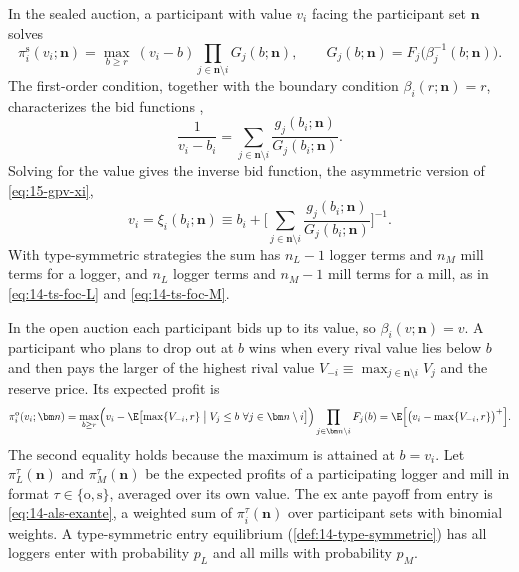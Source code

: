 In the sealed auction, a participant with value $v_i$ facing the participant set $\bm n$ solves
\citep[eq.~(1)]{AtheyLevinSeira2011}
\begin{equation}\label{eq:15-als-sealed}
\pi^{\mathrm s}_i(v_i;\bm n)=\max_{b\ge r}\ (v_i-b)\prod_{j\in\bm n\setminus i}G_j(b;\bm n),
\qquad G_j(b;\bm n)=F_j\bigl(\beta_j^{-1}(b;\bm n)\bigr).
\end{equation}
The first-order condition, together with the boundary condition $\beta_i(r;\bm n)=r$, characterizes the
bid functions \citep[eq.~(2)]{AtheyLevinSeira2011},
\begin{equation}\label{eq:15-als-foc}
\frac{1}{v_i-b_i}=\sum_{j\in\bm n\setminus i}\frac{g_j(b_i;\bm n)}{G_j(b_i;\bm n)} .
\end{equation}
Solving for the value gives the inverse bid function, the asymmetric version of \eqref{eq:15-gpv-xi},
\begin{equation}\label{eq:15-als-inverse}
v_i=\xi_i(b_i;\bm n)\equiv b_i+\Biggl[\sum_{j\in\bm n\setminus i}\frac{g_j(b_i;\bm n)}{G_j(b_i;\bm n)}\Biggr]^{-1}.
\end{equation}
With type-symmetric strategies the sum has $n_L-1$ logger terms and $n_M$ mill terms for a logger, and
$n_L$ logger terms and $n_M-1$ mill terms for a mill, as in \eqref{eq:14-ts-foc-L} and \eqref{eq:14-ts-foc-M}.

In the open auction each participant bids up to its value, so $\beta_i(v;\bm n)=v$. A participant who
plans to drop out at $b$ wins when every rival value lies below $b$ and then pays the larger of the
highest rival value $V_{-i}\equiv\max_{j\in\bm n\setminus i}V_j$ and the reserve price. Its expected
profit is \citep[eq.~(3)]{AtheyLevinSeira2011}
\begin{equation}\label{eq:15-als-open}
\pi^{\mathrm o}_i(v_i;\bm n)=\max_{b\ge r}\Bigl(v_i-\E\bigl[\max\{V_{-i},r\}\bigm|V_j\le b\ \forall j\in\bm
n\setminus i\bigr]\Bigr)\prod_{j\in\bm n\setminus i}F_j(b)=\E\Bigl[\bigl(v_i-\max\{V_{-i},r\}\bigr)^+\Bigr].
\end{equation}
The second equality holds because the maximum is attained at $b=v_i$. Let $\pi^\tau_L(\bm n)$ and
$\pi^\tau_M(\bm n)$ be the expected profits of a participating logger and mill in format
$\tau\in\{\mathrm o,\mathrm s\}$, averaged over its own value. The ex ante payoff from entry is
\eqref{eq:14-als-exante}, a weighted sum of $\pi^\tau_i(\bm n)$ over participant sets with binomial weights.
A type-symmetric entry equilibrium (\cref{def:14-type-symmetric}) has all loggers enter with probability
$p_L$ and all mills with probability $p_M$.

